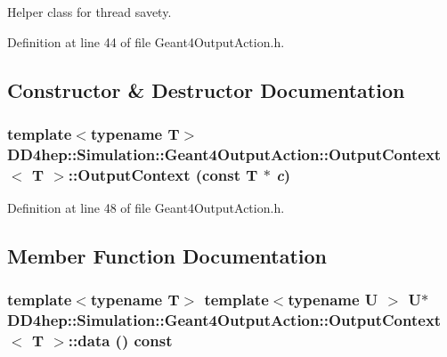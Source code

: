 Helper class for thread savety. 

Definition at line 44 of file Geant4OutputAction.h.

\subsection{Constructor \& Destructor Documentation}
\hypertarget{class_d_d4hep_1_1_simulation_1_1_geant4_output_action_1_1_output_context_a17ae6b51c22363bc840aaa02ea106c9f}{
\subsubsection[{OutputContext}]{\setlength{\rightskip}{0pt plus 5cm}template$<$typename T$>$ {\bf DD4hep::Simulation::Geant4OutputAction::OutputContext}$<$ T $>$::{\bf OutputContext} (const T $\ast$ {\em c})}}
\label{class_d_d4hep_1_1_simulation_1_1_geant4_output_action_1_1_output_context_a17ae6b51c22363bc840aaa02ea106c9f}


Definition at line 48 of file Geant4OutputAction.h.

\subsection{Member Function Documentation}
\hypertarget{class_d_d4hep_1_1_simulation_1_1_geant4_output_action_1_1_output_context_a6945f25ebd357ba286eef2fc6b73a21c}{
\subsubsection[{data}]{\setlength{\rightskip}{0pt plus 5cm}template$<$typename T$>$ template$<$typename U $>$ U$\ast$ {\bf DD4hep::Simulation::Geant4OutputAction::OutputContext}$<$ T $>$::data () const}}
\label{class_d_d4hep_1_1_simulation_1_1_geant4_output_action_1_1_output_context_a6945f25ebd357ba286eef2fc6b73a21c}


